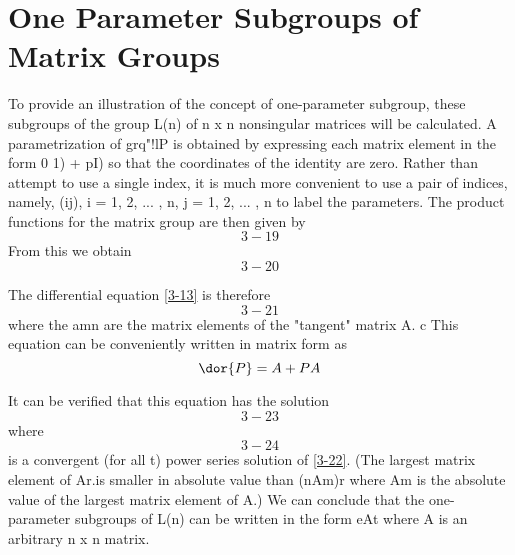 \section{One Parameter Subgroups of Matrix Groups}
To provide an illustration of the concept of one-parameter subgroup, these subgroups of the group L(n) of n x n nonsingular matrices will be calculated. A parametrization of     grq"!lP is obtained by expressing each matrix element in the form 0 1) + pI) so that the coordinates of the identity are zero. Rather than attempt to use a single index, it is much more convenient to use a pair of indices, namely, (ij), i = 1, 2, ... , n, j = 1, 2, ... , n to label the parameters.
The product functions for the matrix group are then given by 
  \begin{equation}   %
      3-19
  \end{equation}
From this we obtain
  \begin{equation}   %
      3-20
  \end{equation}

The differential equation \eqref{3-13} is therefore
  \begin{equation*}   %
      3-21
  \end{equation*}
where the amn are the matrix elements of the "tangent" matrix A. c
This equation can be conveniently written in matrix form as
  \begin{equation}   %
      \dor{P} = A + PA
  \end{equation}

It can be verified that this equation has the solution 
  \begin{equation*}   %
      3-23
  \end{equation*}
where
  \begin{equation*}   %
      3-24
  \end{equation*}
is a convergent (for all t) power series solution of \eqref{3-22}. (The largest matrix element of Ar.is smaller in absolute value than (nAm)r where Am is the absolute value of the largest matrix element of A.) We can conclude that the one-parameter subgroups of L(n) can be written in the form eAt where A is an arbitrary n x n matrix.


\endinput  %